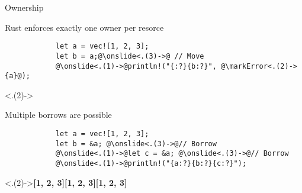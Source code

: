 \begin{multiframe}[fragile]{Ownership}
	\begin{subframe}
		Rust enforces \alert{exactly one} owner per resorce\\[1em]%
		\pause%

		\begin{verbatim}
            let a = vec![1, 2, 3];
            let b = a;@\onslide<.(3)->@ // Move
            @\onslide<.(1)->@println!("{:?}{b:?}", @\markError<.(2)->{a}@);
        \end{verbatim}
		\onslide<.(2)->\\[1em]%
		\addtocounter{beamerpauses}{2}%
	\end{subframe}

	\begin{subframe}
		Multiple \alert{borrows} are possible\\[1em]%
		\pause%

		\begin{verbatim}
            let a = vec![1, 2, 3];
            let b = &a; @\onslide<.(3)->@// Borrow
            @\onslide<.(1)->@let c = &a; @\onslide<.(3)->@// Borrow
            @\onslide<.(1)->@println!("{a:?}{b:?}{c:?}");
        \end{verbatim}
		\onslide<.(2)->{\footnotesize\ttfamily\bfseries[1, 2, 3][1, 2, 3][1, 2, 3]}\\%
		\addtocounter{beamerpauses}{2}%
	\end{subframe}
\end{multiframe}
